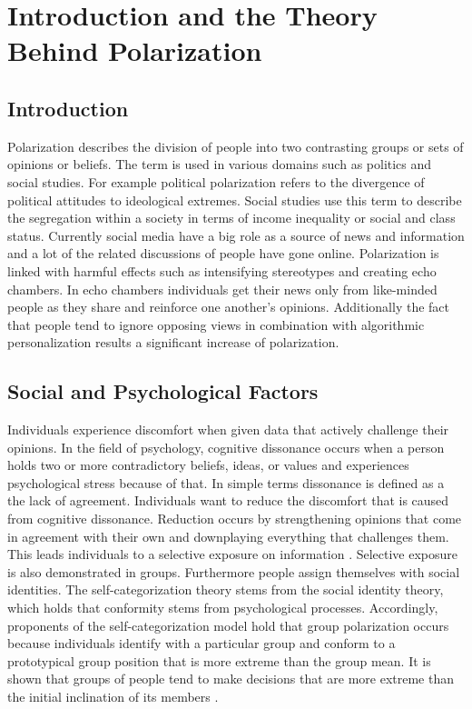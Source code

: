 \chapter{Introduction and the Theory Behind Polarization}
\label{ch:Introduction}


\section{Introduction}
\label{sec:Objectives}

Polarization describes the division of people into two contrasting groups or sets of opinions or beliefs. The term is used in various domains such as politics and social studies. For example political polarization refers to the divergence of political attitudes to ideological extremes. Social studies use this term to  describe the segregation within a society in terms of income inequality or social and class status. Currently social media have a big role as a source of news and information and a lot of the related discussions of people have gone online. Polarization is linked with harmful effects such as intensifying stereotypes and creating echo chambers. In echo chambers individuals get their news only from like-minded people as they share and reinforce one another’s opinions. Additionally the fact that people tend to ignore opposing views in combination with algorithmic personalization results a significant increase of polarization.

\section{Social and Psychological Factors}

Individuals experience discomfort when given data that actively challenge their opinions. In the field of psychology, cognitive dissonance occurs when a person holds two or more contradictory beliefs, ideas, or values and experiences psychological stress because of that. In simple terms dissonance is defined as a the lack of agreement.
Individuals want to reduce the discomfort that is caused from cognitive dissonance. Reduction occurs by strengthening opinions that come in agreement with their own and downplaying everything that challenges them. This leads individuals to a selective exposure on information \cite{jonasHardtFreyThelen2001}. Selective exposure is also demonstrated in groups. Furthermore people assign themselves with social identities. The self-categorization theory stems from the social identity theory, which holds that conformity stems from psychological processes. Accordingly, proponents of the self-categorization model hold that group polarization occurs because individuals identify with a particular group and conform to a prototypical group position that is more extreme than the group mean. It is shown that groups of people tend to make decisions that are more extreme than the initial inclination of its members \cite{sunstein}.

